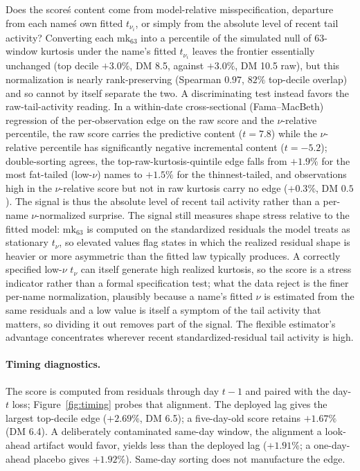 \documentclass[11pt]{article}
\theoremstyle{remark}
\begin{document}
Does the score\'s content come from model-relative
misspecification, departure from each name\'s own fitted $t_{\nu_i}$, or
simply from the absolute level of recent tail activity? Converting each
mk$_{63}$ into a percentile of the simulated null of 63-window kurtosis
under the name's fitted $t_{\nu_i}$ leaves the frontier essentially
unchanged (top decile $+3.0\%$, DM 8.5, against $+3.0\%$, DM 10.5 raw),
but this normalization is nearly rank-preserving (Spearman $0.97$, $82\%$
top-decile overlap) and so cannot by itself separate the two. A
discriminating test instead favors the raw-tail-activity reading.
In a within-date cross-sectional (Fama--MacBeth) regression of the
per-observation edge on the raw score and the $\nu$-relative percentile,
the raw score carries the predictive content ($t=7.8$) while the
$\nu$-relative percentile has significantly negative incremental
content ($t=-5.2$); double-sorting agrees, the top-raw-kurtosis-quintile
edge falls from $+1.9\%$ for the most fat-tailed (low-$\nu$) names
to $+1.5\%$ for the thinnest-tailed, and observations high in the
$\nu$-relative score but not in raw kurtosis carry no edge ($+0.3\%$, DM
$0.5$). The signal is thus the absolute level of recent tail activity rather than
a per-name $\nu$-normalized surprise. The signal still measures shape
stress relative to the fitted model: $\mathrm{mk}_{63}$ is computed on the
standardized residuals the model treats as stationary $t_\nu$, so
elevated values flag states in which the realized residual shape is
heavier or more asymmetric than the fitted law typically produces. A
correctly specified low-$\nu$ $t_\nu$ can itself generate high realized
kurtosis, so the score is a stress indicator rather than a formal
specification test; what the data reject is the finer per-name
normalization, plausibly because a name's fitted $\nu$ is estimated from
the same residuals and a low value is itself a symptom of the tail
activity that matters, so dividing it out removes part of the signal. The
flexible estimator's advantage concentrates wherever recent
standardized-residual tail activity is high.

\paragraph{Timing diagnostics.} The score is computed from residuals
through day $t-1$ and paired with the day-$t$ loss;
Figure~\ref{fig:timing} probes that alignment. The deployed lag gives
the largest top-decile edge ($+2.69\%$, DM 6.5); a five-day-old score
retains $+1.67\%$ (DM 6.4). A deliberately contaminated same-day
window, the alignment a look-ahead artifact would favor, yields
less than the deployed lag ($+1.91\%$; a one-day-ahead placebo
gives $+1.92\%$). Same-day sorting does not manufacture the edge.
\end{document}
